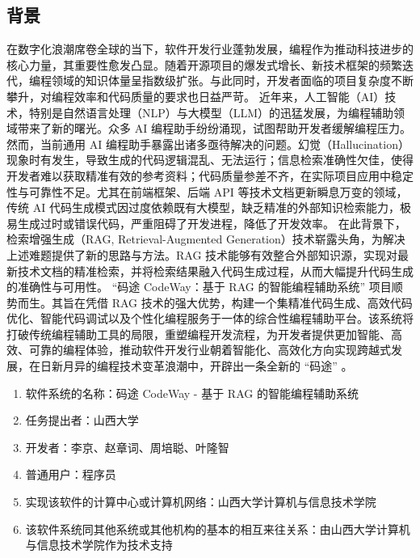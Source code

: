 \documentclass[
    report,     %
    oneside,    %
    UTF8,       %
    zihao=-4    %
]{config} %
\begin{document}
\subsection{背景}
在数字化浪潮席卷全球的当下，软件开发行业蓬勃发展，编程作为推动科技进步的核心力量，其重要性愈发凸显。随着开源项目的爆发式增长、新技术框架的频繁迭代，编程领域的知识体量呈指数级扩张。与此同时，开发者面临的项目复杂度不断攀升，对编程效率和代码质量的要求也日益严苛。
近年来，人工智能（AI）技术，特别是自然语言处理（NLP）与大模型（LLM）的迅猛发展，为编程辅助领域带来了新的曙光。众多 AI 编程助手纷纷涌现，试图帮助开发者缓解编程压力。然而，当前通用 AI 编程助手暴露出诸多亟待解决的问题。幻觉（Hallucination）现象时有发生，导致生成的代码逻辑混乱、无法运行；信息检索准确性欠佳，使得开发者难以获取精准有效的参考资料；代码质量参差不齐，在实际项目应用中稳定性与可靠性不足。尤其在前端框架、后端 API 等技术文档更新瞬息万变的领域，传统 AI 代码生成模式因过度依赖既有大模型，缺乏精准的外部知识检索能力，极易生成过时或错误代码，严重阻碍了开发进程，降低了开发效率。
在此背景下，检索增强生成（RAG, Retrieval-Augmented Generation）技术崭露头角，为解决上述难题提供了新的思路与方法。RAG 技术能够有效整合外部知识源，实现对最新技术文档的精准检索，并将检索结果融入代码生成过程，从而大幅提升代码生成的准确性与可用性。
“码途 CodeWay：基于 RAG 的智能编程辅助系统” 项目顺势而生。其旨在凭借 RAG 技术的强大优势，构建一个集精准代码生成、高效代码优化、智能代码调试以及个性化编程服务于一体的综合性编程辅助平台。该系统将打破传统编程辅助工具的局限，重塑编程开发流程，为开发者提供更加智能、高效、可靠的编程体验，推动软件开发行业朝着智能化、高效化方向实现跨越式发展，在日新月异的编程技术变革浪潮中，开辟出一条全新的 “码途” 。
\begin{enumerate}[label=(\arabic*)]
    \item 软件系统的名称：码途 CodeWay - 基于 RAG 的智能编程辅助系统
    \item 任务提出者：山西大学
    \item 开发者：李京、赵章词、周培聪、叶隆智
    \item 普通用户：程序员
    \item 实现该软件的计算中心或计算机网络：山西大学计算机与信息技术学院
    \item 该软件系统同其他系统或其他机构的基本的相互来往关系：由山西大学计算机与信息技术学院作为技术支持
\end{enumerate}
\end{document}
